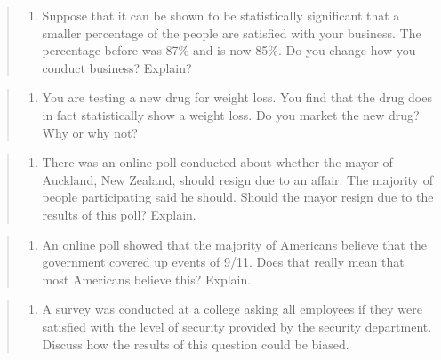\documentclass[]{book}
\providecommand{\tightlist}{%
  \setlength{\itemsep}{0pt}\setlength{\parskip}{0pt}}
\begin{document}
\begin{quote}
\begin{enumerate}
\def\labelenumi{\arabic{enumi}.}
\setcounter{enumi}{8}
\tightlist
\item
  Suppose that it can be shown to be statistically significant that a smaller percentage of the people are satisfied with your business. The percentage before was 87\% and is now 85\%. Do you change how you conduct business? Explain?
\end{enumerate}
\end{quote}

\begin{quote}
\begin{enumerate}
\def\labelenumi{\arabic{enumi}.}
\setcounter{enumi}{9}
\tightlist
\item
  You are testing a new drug for weight loss. You find that the drug does in fact statistically show a weight loss. Do you market the new drug? Why or why not?
\end{enumerate}
\end{quote}

\begin{quote}
\begin{enumerate}
\def\labelenumi{\arabic{enumi}.}
\setcounter{enumi}{10}
\tightlist
\item
  There was an online poll conducted about whether the mayor of
  Auckland, New Zealand, should resign due to an affair. The majority of people participating said he should. Should the mayor resign due to the results of this poll? Explain.
\end{enumerate}
\end{quote}

\begin{quote}
\begin{enumerate}
\def\labelenumi{\arabic{enumi}.}
\setcounter{enumi}{11}
\tightlist
\item
  An online poll showed that the majority of Americans believe that the government covered up events of 9/11. Does that really mean that most Americans believe this? Explain.
\end{enumerate}
\end{quote}

\begin{quote}
\begin{enumerate}
\def\labelenumi{\arabic{enumi}.}
\setcounter{enumi}{12}
\tightlist
\item
  A survey was conducted at a college asking all employees if they were satisfied with the level of security provided by the security department. Discuss how the results of this question could be biased.
\end{enumerate}
\end{quote}
\end{document}
